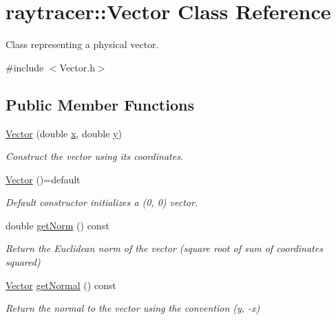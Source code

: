 \hypertarget{classraytracer_1_1Vector}{}\section{raytracer\+:\+:Vector Class Reference}
\label{classraytracer_1_1Vector}


Class representing a physical vector.  




{\ttfamily \#include $<$Vector.\+h$>$}

\subsection*{Public Member Functions}
\begin{DoxyCompactItemize}
\item 
\hyperlink{classraytracer_1_1Vector_a4a257f16b43edb428655be54c640fb69}{Vector} (double \hyperlink{classraytracer_1_1Vector_a14aa5241f6abb01266ea77586fa1437a}{x}, double \hyperlink{classraytracer_1_1Vector_ad4d58fd3af1dbf59eae8c55a67e85b3a}{y})
\begin{DoxyCompactList}\small\item\em Construct the vector using its coordinates. \end{DoxyCompactList}\item 
\mbox{\label{classraytracer_1_1Vector_ab6d9a3c5c8d49c49376b11bbfa2d64ae}} 
\hyperlink{classraytracer_1_1Vector_ab6d9a3c5c8d49c49376b11bbfa2d64ae}{Vector} ()=default
\begin{DoxyCompactList}\small\item\em Default constructor initializes a (0, 0) vector. \end{DoxyCompactList}\item 
double \hyperlink{classraytracer_1_1Vector_a33106a20cb1d9c921664a7622c41cf6b}{get\+Norm} () const
\begin{DoxyCompactList}\small\item\em Return the Euclidean norm of the vector (square root of sum of coordinates squared) \end{DoxyCompactList}\item 
\hyperlink{classraytracer_1_1Vector}{Vector} \hyperlink{classraytracer_1_1Vector_a21d2e5fd46c25b7e1c33fec1ecc9bd95}{get\+Normal} () const
\begin{DoxyCompactList}\small\item\em Return the normal to the vector using the convention (y, -\/x) \end{DoxyCompactList}\end{DoxyCompactItemize}
